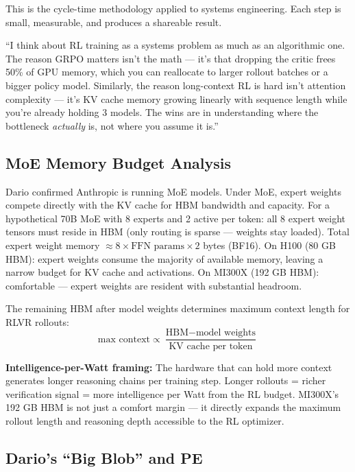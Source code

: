 This is the cycle-time methodology applied to systems engineering. Each step is small, measurable, and produces a shareable result.

\begin{sayit}
``I think about RL training as a systems problem as much as an algorithmic one. The reason GRPO matters isn't the math --- it's that dropping the critic frees 50\% of GPU memory, which you can reallocate to larger rollout batches or a bigger policy model. Similarly, the reason long-context RL is hard isn't attention complexity --- it's KV cache memory growing linearly with sequence length while you're already holding 3 models. The wins are in understanding where the bottleneck \textit{actually} is, not where you assume it is.''
\end{sayit}

\subsection{MoE Memory Budget Analysis}

Dario confirmed Anthropic is running MoE models. Under MoE, expert weights compete directly with the KV cache for HBM bandwidth and capacity. For a hypothetical 70B MoE with 8 experts and 2 active per token: all 8 expert weight tensors must reside in HBM (only routing is sparse --- weights stay loaded). Total expert weight memory $\approx 8 \times \text{FFN params} \times 2$ bytes (BF16). On H100 (80 GB HBM): expert weights consume the majority of available memory, leaving a narrow budget for KV cache and activations. On MI300X (192 GB HBM): comfortable --- expert weights are resident with substantial headroom.

The remaining HBM after model weights determines maximum context length for RLVR rollouts:
\[
\text{max context} \propto \frac{\text{HBM} - \text{model weights}}{\text{KV cache per token}}
\]

\textbf{Intelligence-per-Watt framing:} The hardware that can hold more context generates longer reasoning chains per training step. Longer rollouts = richer verification signal = more intelligence per Watt from the RL budget. MI300X's 192 GB HBM is not just a comfort margin --- it directly expands the maximum rollout length and reasoning depth accessible to the RL optimizer.

\subsection{Dario's ``Big Blob'' and PE}

